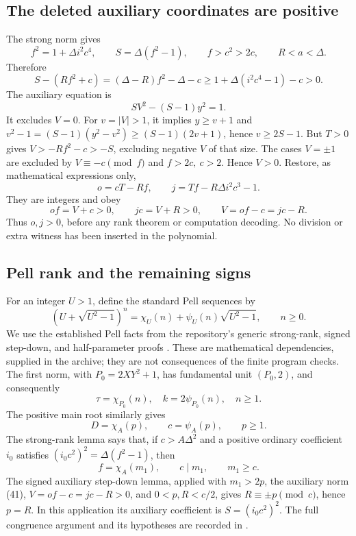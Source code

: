 \documentclass[11pt,a4paper]{article}
\theoremstyle{definition}
\theoremstyle{remark}
\newcommand{\src}[1]{\texttt{\detokenize{#1}}}
\begin{document}
\subsection{The deleted auxiliary coordinates are positive}
The strong norm gives
\[
 f^2=1+\Delta i^2c^4,\qquad
 S=\Delta(f^2-1),\qquad f>c^2>2c,\qquad R<a<\Delta. \tag{39}
\]
Therefore
\[
 S-(Rf^2+c)
  =(\Delta-R)f^2-\Delta-c
  \ge1+\Delta(i^2c^4-1)-c>0. \tag{40}
\]
The auxiliary equation is
\[
 SV^2-(S-1)y^2=1. \tag{41}
\]
It excludes \(V=0\). For \(v=|V|>1\), it implies
\(y\ge v+1\) and
\(v^2-1=(S-1)(y^2-v^2)\ge(S-1)(2v+1)\), hence
\(v\ge2S-1\). But \(T>0\) gives
\(V>-Rf^2-c>-S\), excluding negative \(V\) of that size.
The cases \(V=\pm1\) are excluded by \(V\equiv-c\pmod f\) and
\(f>2c,\ c>2\). Hence \(V>0\).
Restore, as mathematical expressions only,
\[
 o=cT-Rf,\qquad
 j=Tf-R\Delta i^2c^3-1. \tag{42}\label{eq:restore}
\]
They are integers and obey
\[
 of=V+c>0,\qquad jc=V+R>0,\qquad V=of-c=jc-R. \tag{43}
\]
Thus \(o,j>0\), before any rank theorem or computation decoding.
No division or extra witness has been inserted in the polynomial.

\subsection{Pell rank and the remaining signs}\label{sec:rank}
For an integer \(U>1\), define the standard Pell sequences by
\[
 (U+\sqrt{U^2-1})^n
   =\chi_U(n)+\psi_U(n)\sqrt{U^2-1},
 \qquad n\ge0. \tag{44}
\]
We use the established Pell facts from the repository's
generic strong-rank, signed step-down, and half-parameter proofs
\cite{pellrank,pellsigned,halfparameter}. These are mathematical
dependencies, supplied in the archive; they are not consequences
of the finite program checks.
The first norm, with \(P_0=2XY^2+1\), has fundamental unit
\((P_0,2)\), and consequently
\[
 \tau=\chi_{P_0}(n),\quad k=2\psi_{P_0}(n),\quad n\ge1. \tag{45}
\]
The positive main root similarly gives
\[
 D=\chi_A(p),\qquad c=\psi_A(p),\qquad p\ge1. \tag{46}
\]
The strong-rank lemma says that, if
\(c>A\Delta^2\) and a positive ordinary coefficient \(i_0\)
satisfies \((i_0c^2)^2=\Delta(f^2-1)\), then
\[
 f=\chi_A(m_1),\qquad c\mid m_1,\qquad m_1\ge c. \tag{47}
\]
The signed auxiliary step-down lemma, applied with \(m_1>2p\),
the auxiliary norm (41), \(V=of-c=jc-R>0\), and
\(0<p,R<c/2\), gives \(R\equiv\pm p\pmod c\), hence \(p=R\).
In this application its auxiliary coefficient is
\(S=(i_0c^2)^2\). The full congruence argument and its hypotheses
are recorded in \src{proofs/pell_lemma_audit.md}.
\end{document}
